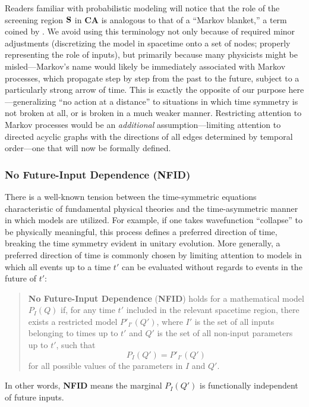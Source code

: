\documentclass[rmp, aps, preprint, longbibliography]{revtex4-1}
\begin{document}
Readers familiar with probabilistic modeling will notice that the role of the screening region $\bf{S}$ in {\bf CA} is analogous to that of a ``Markov blanket,'' a term coined by \textcite{pearl1988}.   We avoid using this terminology not only because of required minor adjustments (discretizing the model in spacetime onto a set of nodes; properly representing the role of inputs), but primarily because many physicists might be misled---Markov's name would likely be immediately associated with Markov processes, which propagate step by step from the past to the future, subject to a particularly strong arrow of time.  This is exactly the opposite of our purpose here---generalizing ``no action at a distance'' to situations in which time symmetry is not broken at all, or is broken in a much weaker manner.  Restricting attention to Markov processes would be an \emph{additional} assumption---limiting attention to directed acyclic graphs with the directions of all edges determined by temporal order---one that will now be formally defined. 

\subsubsection{No Future-Input Dependence {\rm ({\bf NFID})}}

There is a well-known tension between the time-symmetric equations characteristic of fundamental physical theories and the time-asymmetric manner in which models are utilized.  For example, if one takes wavefunction ``collapse'' to be physically meaningful, this process defines a preferred direction of time, breaking the time symmetry evident in unitary evolution.  More generally, a preferred direction of time is commonly chosen by limiting attention to models in which all events up to a time $t'$ can be evaluated without regards to events in the future of $t'$: 

\begin{quote}
{\bf No Future-Input Dependence} ({\bf NFID}) holds for a mathematical model $P_I(Q)$ if, for any time $t'$ included in the relevant spacetime region, there exists a restricted model $P'_{I'}(Q')$, where $I'$ is the set of all inputs belonging to times up to $t'$ and $Q'$ is the set of all non-input parameters up to $t'$, such that
\begin{equation}
\label{eq:NFID}
P_I(Q')=P'_{I'}(Q')
\end{equation}
for all possible values of the parameters in $I$ and $Q'$.  
\end{quote}
In other words, {\bf NFID} means the marginal $P_I(Q')$ is functionally independent of future inputs.
\end{document}
